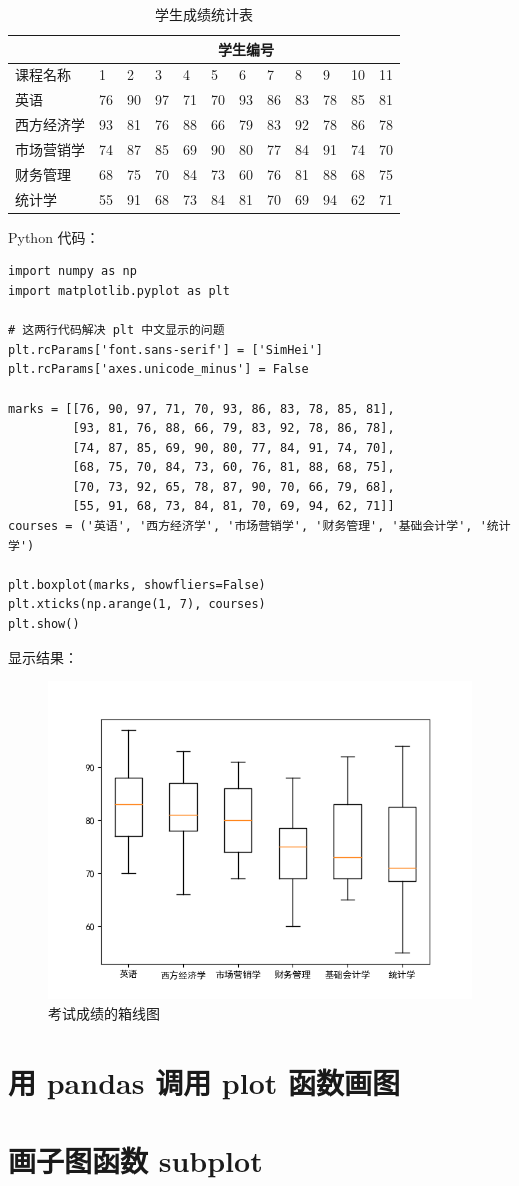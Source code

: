 \begin{table}[!ht]
\centering
\renewcommand{\arraystretch}{1.2}
\caption{学生成绩统计表}
\begin{tabular}{|l|l|l|l|l|l|l|l|l|l|l|l|}
\hline
&\multicolumn{11}{c|}{学生编号}  \\\hline
课程名称 & 1 & 2 & 3 & 4 & 5 & 6 & 7 & 8 & 9 & 10 & 11 \\ \hline
英语 & 76 & 90 & 97 & 71 & 70 & 93 & 86 & 83 & 78 & 85 & 81 \\ \hline
西方经济学 & 93 & 81 & 76 & 88 & 66 & 79 & 83 & 92 & 78 & 86 & 78 \\ \hline
市场营销学 & 74 & 87 & 85 & 69 & 90 & 80 & 77 & 84 & 91 & 74 & 70 \\ \hline
财务管理 & 68 & 75 & 70 & 84 & 73 & 60 & 76 & 81 & 88 & 68 & 75 \\ \hline
统计学 & 55 & 91 & 68 & 73 & 84 & 81 & 70 & 69 & 94 & 62 & 71 \\ \hline
\end{tabular}
\end{table}

Python 代码：
\begin{lstlisting}[Language=Python]
import numpy as np
import matplotlib.pyplot as plt

# 这两行代码解决 plt 中文显示的问题
plt.rcParams['font.sans-serif'] = ['SimHei']
plt.rcParams['axes.unicode_minus'] = False

marks = [[76, 90, 97, 71, 70, 93, 86, 83, 78, 85, 81],
         [93, 81, 76, 88, 66, 79, 83, 92, 78, 86, 78],
         [74, 87, 85, 69, 90, 80, 77, 84, 91, 74, 70],
         [68, 75, 70, 84, 73, 60, 76, 81, 88, 68, 75],
         [70, 73, 92, 65, 78, 87, 90, 70, 66, 79, 68],
         [55, 91, 68, 73, 84, 81, 70, 69, 94, 62, 71]]
courses = ('英语', '西方经济学', '市场营销学', '财务管理', '基础会计学', '统计学')

plt.boxplot(marks, showfliers=False)
plt.xticks(np.arange(1, 7), courses)
plt.show()
\end{lstlisting}

显示结果：
\begin{figure}[!ht]
  \centering
  \includegraphics[scale=0.8]{figure/box.png}
  \caption{考试成绩的箱线图}\label{fig:box}
\end{figure}

\section{用 pandas 调用 plot 函数画图}
\section{画子图函数 subplot}
